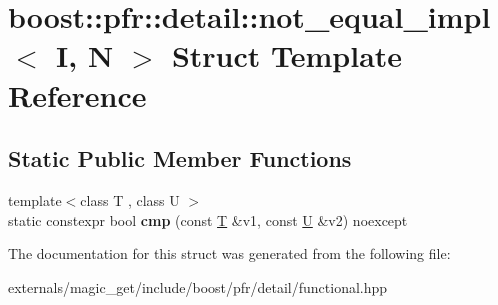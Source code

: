 \hypertarget{structboost_1_1pfr_1_1detail_1_1not__equal__impl}{}\section{boost\+:\+:pfr\+:\+:detail\+:\+:not\+\_\+equal\+\_\+impl$<$ I, N $>$ Struct Template Reference}
\label{structboost_1_1pfr_1_1detail_1_1not__equal__impl}
\subsection*{Static Public Member Functions}
\begin{DoxyCompactItemize}
\item 
\mbox{\label{structboost_1_1pfr_1_1detail_1_1not__equal__impl_a52c8b154ab85994a4c4aa1acff500223}} 
{\footnotesize template$<$class T , class U $>$ }\\static constexpr bool {\bfseries cmp} (const \mbox{\hyperlink{struct_t}{T}} \&v1, const \mbox{\hyperlink{union_u}{U}} \&v2) noexcept
\end{DoxyCompactItemize}


The documentation for this struct was generated from the following file\+:\begin{DoxyCompactItemize}
\item 
externals/magic\+\_\+get/include/boost/pfr/detail/functional.\+hpp\end{DoxyCompactItemize}
